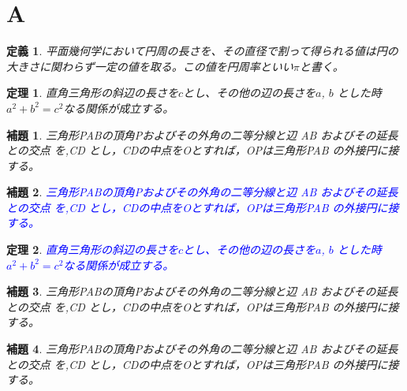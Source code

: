 \documentclass[a5paper]{jarticle}
\newtheorem{theo}{定理}[section]
\newtheorem{defi}{定義}[section]
\newtheorem{lemm}{補題}[section]
\renewenvironment{leftbar}{%
  \def\FrameCommand{\vrule width 1pt \hspace{10pt}}%
  \MakeFramed {\advance\hsize-\width \FrameRestore}}%
 {\endMakeFramed}
\newenvironment{redleftbar}{%
  \def\FrameCommand{\textcolor{red}{\vrule width 1pt} \hspace{10pt}}%
  \MakeFramed {\advance\hsize-\width \FrameRestore}}%
 {\endMakeFramed}
\newenvironment{lightgrayleftbar}{%
  \def\FrameCommand{\textcolor{lightgray}{\vrule width 1zw} \hspace{10pt}}%
  \MakeFramed {\advance\hsize-\width \FrameRestore}}%
{\endMakeFramed}
\begin{document}
\section{A}

\begin{leftbar}
\begin{defi}
平面幾何学において円周の長さを、その直径で割って得られる値は円の大きさに関わらず一定の値を取る。この値を円周率といい$\pi$と書く。
\end{defi}
\end{leftbar}

\begin{leftbar}
\begin{theo}
直角三角形の斜辺の長さを$c$とし、その他の辺の長さを$ a$, $b$ とした時$ a^2+ b^2= c^2$なる関係が成立する。
\end{theo}
\end{leftbar}

\begin{leftbar}
\begin{lemm}
三角形PABの頂角Pおよびその外角の二等分線と辺 AB およびその延長との交点
を,CD とし，CDの中点をOとすれば，OPは三角形PAB の外接円に接する。
\end{lemm}
\end{leftbar}

\begin{redleftbar}
\begin{lemm}
{\textcolor{blue}{三角形PABの頂角Pおよびその外角の二等分線と辺 AB およびその延長との交点
を,CD とし，CDの中点をOとすれば，OPは三角形PAB の外接円に接する。}}
\end{lemm}
\end{redleftbar}

\begin{redleftbar}
\begin{theo}
{\textcolor{blue}{直角三角形の斜辺の長さを$c$とし、その他の辺の長さを$ a$, $b$ とした時$ a^2+ b^2= c^2$なる関係が成立する。}}
\end{theo}
\end{redleftbar}

\begin{redleftbar}
\begin{lemm}
三角形PABの頂角Pおよびその外角の二等分線と辺 AB およびその延長との交点
を,CD とし，CDの中点をOとすれば，OPは三角形PAB の外接円に接する。
\end{lemm}
\end{redleftbar}

\begin{lightgrayleftbar}
\begin{lemm}
三角形PABの頂角Pおよびその外角の二等分線と辺 AB およびその延長との交点
を,CD とし，CDの中点をOとすれば，OPは三角形PAB の外接円に接する。
\end{lemm}
\end{lightgrayleftbar}
\end{document}
